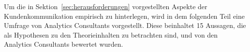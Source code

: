 \documentclass[../main.tex]{subfiles}
\begin{document}
Um die in Sektion~\ref{sec:herausforderungen} vorgestellten Aspekte der Kundenkommunikation empirisch zu hinterlegen, wird in dem folgenden Teil eine Umfrage von Analytics Consultants vorgestellt.
Diese beinhaltet 15 Aussagen, die als Hypothesen zu den Theorieinhalten zu betrachten sind, und von den Analytics Consultants bewertet wurden.
\end{document}
